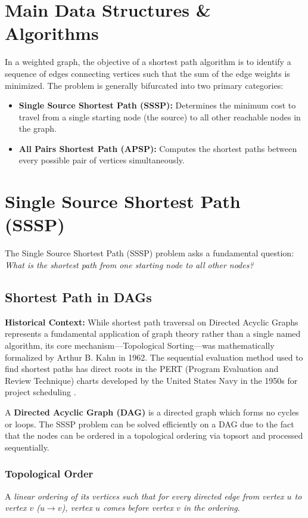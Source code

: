 \section{Main Data Structures \& Algorithms}
In a weighted graph, the objective of a shortest path algorithm is to identify a sequence of edges connecting vertices such that the sum of the edge weights is minimized. The problem is generally bifurcated into two primary categories:
\begin{itemize}
    \item \textbf{Single Source Shortest Path (SSSP):} Determines the minimum cost to travel from a single starting node (the source) to all other reachable nodes in the graph.
    \item \textbf{All Pairs Shortest Path (APSP):} Computes the shortest paths between every possible pair of vertices simultaneously.
\end{itemize}

\section{Single Source Shortest Path (SSSP)}
The Single Source Shortest Path (SSSP) problem asks a fundamental question: \textit{What is the shortest path from one starting node to all other nodes?}

\subsection{Shortest Path in DAGs}
\textbf{Historical Context:} While shortest path traversal on Directed Acyclic Graphs represents a fundamental application of graph theory rather than a single named algorithm, its core mechanism—Topological Sorting—was mathematically formalized by Arthur B. Kahn in 1962. The sequential evaluation method used to find shortest paths has direct roots in the PERT (Program Evaluation and Review Technique) charts developed by the United States Navy in the 1950s for project scheduling \cite{kahn1962topological,malcolm1959application}.

\vspace{0.2cm}
A \textbf{Directed Acyclic Graph (DAG)} is a directed graph which forms no cycles or loops. The SSSP problem can be solved efficiently on a DAG due to the fact that the nodes can be ordered in a topological ordering via topsort and processed sequentially.

\subsubsection{Topological Order}
A \textit{linear ordering of its vertices such that for every directed edge from vertex $u$ to vertex $v$ ($u \to v$), vertex $u$ comes before vertex $v$ in the ordering}.

